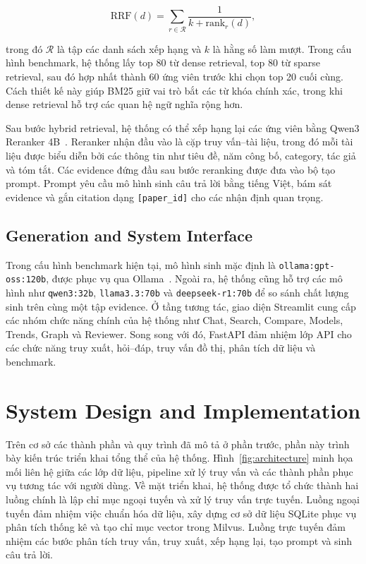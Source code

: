 \documentclass[conference]{IEEEtran}
\begin{document}
\begin{equation}
\text{RRF}(d)=\sum_{r \in \mathcal{R}}\frac{1}{k+\text{rank}_{r}(d)},
\end{equation}

trong đó $\mathcal{R}$ là tập các danh sách xếp hạng và $k$ là hằng số làm mượt. Trong cấu hình benchmark, hệ thống lấy top 80 từ dense retrieval, top 80 từ sparse retrieval, sau đó hợp nhất thành 60 ứng viên trước khi chọn top 20 cuối cùng. Cách thiết kế này giúp BM25 giữ vai trò bắt các từ khóa chính xác, trong khi dense retrieval hỗ trợ các quan hệ ngữ nghĩa rộng hơn.

Sau bước hybrid retrieval, hệ thống có thể xếp hạng lại các ứng viên bằng Qwen3 Reranker 4B~\cite{qwen3reranker2025}. Reranker nhận đầu vào là cặp truy vấn--tài liệu, trong đó mỗi tài liệu được biểu diễn bởi các thông tin như tiêu đề, năm công bố, category, tác giả và tóm tắt. Các evidence đứng đầu sau bước reranking được đưa vào bộ tạo prompt. Prompt yêu cầu mô hình sinh câu trả lời bằng tiếng Việt, bám sát evidence và gắn citation dạng \texttt{[paper\_id]} cho các nhận định quan trọng.

\subsection{Generation and System Interface}

Trong cấu hình benchmark hiện tại, mô hình sinh mặc định là \texttt{ollama:gpt-oss:120b}, được phục vụ qua Ollama~\cite{ollama2026}. Ngoài ra, hệ thống cũng hỗ trợ các mô hình như \texttt{qwen3:32b}, \texttt{llama3.3:70b} và \texttt{deepseek-r1:70b} để so sánh chất lượng sinh trên cùng một tập evidence. Ở tầng tương tác, giao diện Streamlit cung cấp các nhóm chức năng chính của hệ thống như Chat, Search, Compare, Models, Trends, Graph và Reviewer. Song song với đó, FastAPI đảm nhiệm lớp API cho các chức năng truy xuất, hỏi--đáp, truy vấn đồ thị, phân tích dữ liệu và benchmark.

\section{System Design and Implementation}

Trên cơ sở các thành phần và quy trình đã mô tả ở phần trước, phần này trình bày kiến trúc triển khai tổng thể của hệ thống. Hình~\ref{fig:architecture} minh họa mối liên hệ giữa các lớp dữ liệu, pipeline xử lý truy vấn và các thành phần phục vụ tương tác với người dùng. Về mặt triển khai, hệ thống được tổ chức thành hai luồng chính là lập chỉ mục ngoại tuyến và xử lý truy vấn trực tuyến. Luồng ngoại tuyến đảm nhiệm việc chuẩn hóa dữ liệu, xây dựng cơ sở dữ liệu SQLite phục vụ phân tích thống kê và tạo chỉ mục vector trong Milvus. Luồng trực tuyến đảm nhiệm các bước phân tích truy vấn, truy xuất, xếp hạng lại, tạo prompt và sinh câu trả lời.
\end{document}

